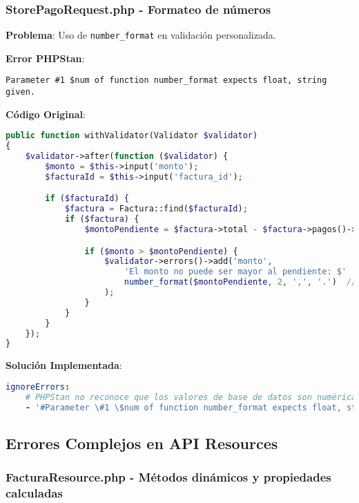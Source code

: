 \documentclass[12pt,a4paper]{article}
\begin{document}
\subsubsection{StorePagoRequest.php - Formateo de números}

\textbf{Problema}: Uso de \texttt{number\_format} en validación personalizada.

\textbf{Error PHPStan}:
\begin{lstlisting}[caption=Error en StorePagoRequest.php]
Parameter #1 $num of function number_format expects float, string given.
\end{lstlisting}

\textbf{Código Original}:
\begin{lstlisting}[language=php, caption=StorePagoRequest.php - Validación con number_format]
public function withValidator(Validator $validator)
{
    $validator->after(function ($validator) {
        $monto = $this->input('monto');
        $facturaId = $this->input('factura_id');

        if ($facturaId) {
            $factura = Factura::find($facturaId);
            if ($factura) {
                $montoPendiente = $factura->total - $factura->pagos()->sum('monto');

                if ($monto > $montoPendiente) {
                    $validator->errors()->add('monto',
                        'El monto no puede ser mayor al pendiente: $' .
                        number_format($montoPendiente, 2, ',', '.')  // Error: string esperado
                    );
                }
            }
        }
    });
}
\end{lstlisting}

\textbf{Solución Implementada}:
\begin{lstlisting}[language=yaml, caption=Ignorado para number_format con valores numéricos]
ignoreErrors:
    # PHPStan no reconoce que los valores de base de datos son numéricamente válidos
    - '#Parameter \#1 \$num of function number_format expects float, string given#'
\end{lstlisting}

\subsection{Errores Complejos en API Resources}

\subsubsection{FacturaResource.php - Métodos dinámicos y propiedades calculadas}
\end{document}
